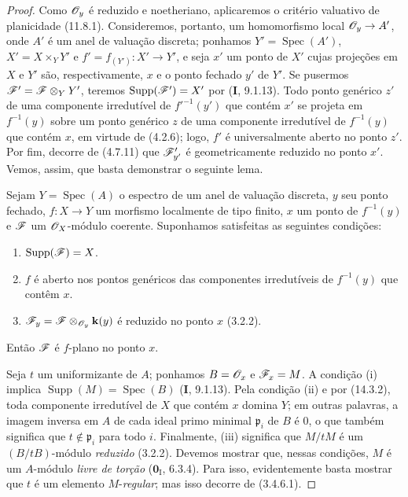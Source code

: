 \begin{proof}
\label{IV.15.2.2-proof}
Como $\mathscr{O}_y$ é reduzido e noetheriano, aplicaremos o critério valuativo de planicidade (11.8.1). Consideremos, portanto, um homomorfismo local $\sh{O}_y\to A'$, onde $A'$ é um anel de valuação discreta; ponhamos $Y'=\operatorname{Spec}(A')$, $X'=X\times_Y Y'$ e $f'=f_{(Y')}:X'\to Y'$, e seja $x'$ um ponto de $X'$ cujas projeções em $X$ e $Y'$ são, respectivamente, $x$ e o ponto fechado $y'$ de $Y'$. Se pusermos $\mathscr{F}'=\mathscr{F}\otimes_Y Y'$, teremos $\operatorname{Supp}(\mathscr{F}')=X'$ por ($\textbf{I}$, 9.1.13). Todo ponto genérico $z'$ de uma componente irredutível de $f'^{-1}(y')$ que contém $x'$ se projeta em $f^{-1}(y)$ sobre um ponto genérico $z$ de uma componente irredutível de $f^{-1}(y)$ que contém $x$, em virtude de (4.2.6); logo, $f'$ é universalmente aberto no ponto $z'$. Por fim, decorre de (4.7.11) que $\mathscr{F}'_{y'}$ é geometricamente reduzido no ponto $x'$. Vemos, assim, que basta demonstrar o seguinte lema.

\begin{lemma}[15.2.2.1]
\label{IV.15.2.2.1}
Sejam $Y=\operatorname{Spec}(A)$ o espectro de um anel de valuação discreta, $y$ seu ponto fechado, $f:X\to Y$ um morfismo localmente de tipo finito, $x$ um ponto de $f^{-1}(y)$ e $\mathscr{F}$ um $\mathscr{O}_X$-módulo coerente. Suponhamos satisfeitas as seguintes condições:
\begin{enumerate}[label=(\roman*)]
  \item $\operatorname{Supp}(\mathscr{F})=X$.
  \item $f$ é aberto nos pontos genéricos das componentes irredutíveis de $f^{-1}(y)$ que contêm $x$.
  \item $\mathscr{F}_y=\mathscr{F}\otimes_{\mathscr{O}_y}\mathbf{k}(y)$ é reduzido no ponto $x$ (3.2.2).
\end{enumerate}
Então $\mathscr{F}$ é $f$-plano no ponto $x$.
\end{lemma}

Seja $t$ um uniformizante de $A$; ponhamos $B=\mathscr{O}_x$ e $\mathscr{F}_x=M$. A condição (i) implica $\operatorname{Supp}(M)=\operatorname{Spec}(B)$ ($\textbf{I}$, 9.1.13). Pela condição (ii) e por (14.3.2), toda componente irredutível de $X$ que contém $x$ domina $Y$; em outras palavras, a imagem inversa em $A$ de cada ideal primo minimal $\mathfrak p_i$ de $B$ é $0$, o que também significa que $t\notin\mathfrak p_i$ para todo $i$. Finalmente, (iii) significa que $M/tM$ é um $(B/tB)$-módulo \emph{reduzido} (3.2.2). Devemos mostrar que, nessas condições, $M$ é um $A$-módulo \emph{livre de torção} ($\mathbf{0}_{\mathrm I}$, 6.3.4). Para isso, evidentemente basta mostrar que $t$ é um elemento $M$-\emph{regular}; mas isso decorre de (3.4.6.1).
\end{proof}

